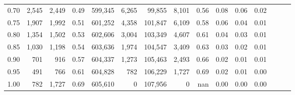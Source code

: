 \begin{tabular}{rrrrrrrrrrrrrrr}
0.70 &    2,545 &   2,449 &  0.49 &  599,345 &    6,265 &   99,855 &    8,101 &  0.56 &  0.08 &  0.06 &      0.02 \\
0.75 &    1,907 &   1,992 &  0.51 &  601,252 &    4,358 &  101,847 &    6,109 &  0.58 &  0.06 &  0.04 &      0.01 \\
0.80 &    1,354 &   1,502 &  0.53 &  602,606 &    3,004 &  103,349 &    4,607 &  0.61 &  0.04 &  0.03 &      0.01 \\
0.85 &    1,030 &   1,198 &  0.54 &  603,636 &    1,974 &  104,547 &    3,409 &  0.63 &  0.03 &  0.02 &      0.01 \\
0.90 &      701 &     916 &  0.57 &  604,337 &    1,273 &  105,463 &    2,493 &  0.66 &  0.02 &  0.01 &      0.01 \\
0.95 &      491 &     766 &  0.61 &  604,828 &      782 &  106,229 &    1,727 &  0.69 &  0.02 &  0.01 &      0.00 \\
1.00 &      782 &   1,727 &  0.69 &  605,610 &        0 &  107,956 &        0 &   nan &  0.00 &  0.00 &      0.00 \\
\bottomrule
\end{tabular}
